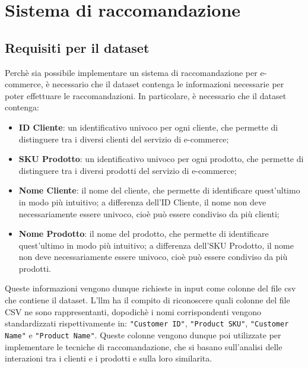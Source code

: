 \chapter{Sistema di raccomandazione}
\label{cap:sistema-raccomandazione}


\section{Requisiti per il dataset}

Perchè sia possibile implementare un sistema di raccomandazione per e-commerce, è necessario che il dataset contenga le informazioni necessarie per poter effettuare le raccomandazioni. In particolare, è necessario che il dataset contenga:
\begin{itemize}
    \item \textbf{ID Cliente}: un identificativo univoco per ogni cliente, che permette di distinguere tra i diversi clienti del servizio di e-commerce;
    \item \textbf{SKU Prodotto}: un identificativo univoco per ogni prodotto, che permette di distinguere tra i diversi prodotti del servizio di e-commerce;
    \item \textbf{Nome Cliente}: il nome del cliente, che permette di identificare quest'ultimo in modo più intuitivo; a differenza dell'ID Cliente, il nome non deve necessariamente essere univoco, cioè può essere condiviso da più clienti;
    \item \textbf{Nome Prodotto}: il nome del prodotto, che permette di identificare quest'ultimo in modo più intuitivo; a differenza dell'SKU Prodotto, il nome non deve necessariamente essere univoco, cioè può essere condiviso da più prodotti.
\end{itemize}

Queste informazioni vengono dunque richieste in input come colonne del file \gls{csv} che contiene il dataset. L'\gls{llm} ha il compito di riconoscere quali colonne del file CSV ne sono rappresentanti, dopodichè i nomi corrispondenti vengono standardizzati rispettivamente in: \texttt{"Customer ID"}, \texttt{"Product SKU"}, \texttt{"Customer Name"} e \texttt{"Product Name"}. Queste colonne vengono dunque poi utilizzate per implementare le tecniche di raccomandazione, che si basano sull'analisi delle interazioni tra i clienti e i prodotti e sulla loro \gls{similarita}.

